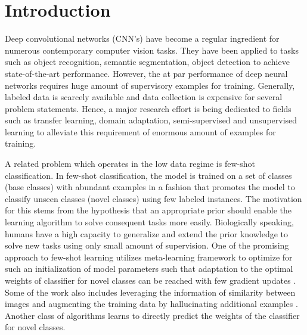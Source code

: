 \documentclass[10pt,twocolumn,letterpaper]{article}
\begin{document}
\section{Introduction}
Deep convolutional networks (CNN's) have become a regular ingredient for numerous contemporary computer vision tasks. They have been applied to tasks such as object recognition, semantic segmentation, object detection \cite{introconv1,introconv2,maskrnn,he2016deep,krizhevsky2012ImageNet} to achieve state-of-the-art performance.
However, the at par performance of deep neural networks requires huge amount of supervisory examples for training. Generally, labeled data is scarcely available and data collection is expensive for several problem statements. 
Hence, a major research effort is being dedicated to fields such as transfer learning, domain adaptation, semi-supervised and unsupervised learning \cite{domain_unsupervised_2015,domain_cluster_2010,transfer2010} to alleviate this requirement of enormous amount of examples for training.

A related problem which operates in the low data regime is few-shot classification. In few-shot classification, the model is trained on a set of classes (base classes) with abundant examples in a fashion that promotes the model to classify unseen classes (novel classes) using few labeled instances. The motivation for this stems from the hypothesis that an appropriate prior should enable the learning algorithm to solve consequent tasks more easily. Biologically speaking, humans have a high capacity to generalize and extend the prior knowledge to solve new tasks using only small amount of supervision. 
One of the promising approach to few-shot learning utilizes meta-learning framework to optimize for such an initialization of model parameters such that adaptation to the optimal weights of classifier for novel classes can be reached with few gradient updates \cite{ravi2016optimization, finn2017model, leo2019, nichol2018first}. Some of the work also includes leveraging the information of similarity between images \cite{vinyals2016matching,snell2017prototypical,sung2018learning,bertinetto2018meta,garcia2017few} and augmenting the training data by hallucinating additional examples \cite{hariharan2017low, wang2018low, fewshot2018hallo}.
Another class of algorithms \cite{fewshot2018cc,fewshot2018cc2} learns to directly predict the weights of the classifier for novel classes.
\end{document}
